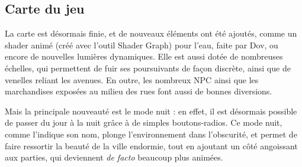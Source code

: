 \subsection{Carte du jeu}

La carte est désormais finie, et de nouveaux éléments ont été ajoutés, comme un shader animé (créé avec l'outil Shader Graph) pour l'eau,
faite par Dov, ou encore de nouvelles lumières dynamiques. Elle est aussi dotée de nombreuses échelles, qui permettent de fuir ses poursuivants 
de façon discrète, ainsi que de venelles reliant les avenues.
En outre, les nombreux NPC ainsi que les marchandises exposées au milieu des rues font aussi de bonnes diversions.

Mais la principale nouveauté est le mode nuit : en effet, il est désormais possible de passer du jour à la nuit grâce à de simples boutons-radios. Ce mode nuit, comme l'indique
son nom, plonge l'environnement dans l'obscurité, et permet de faire ressortir la beauté de la ville endormie, tout en ajoutant un côté angoissant aux parties,
qui deviennent \textit{de facto} beaucoup plus animées.




